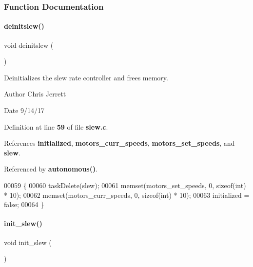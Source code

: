 \subsubsection{Function Documentation}
\mbox{\label{a00143_a981c9990a969d2587e66e550737f7cd9}} 
\paragraph{deinitslew()}
{\footnotesize\ttfamily void deinitslew (\begin{DoxyParamCaption}{ }\end{DoxyParamCaption})}



Deinitializes the slew rate controller and frees memory. 

\begin{DoxyAuthor}{Author}
Chris Jerrett 
\end{DoxyAuthor}
\begin{DoxyDate}{Date}
9/14/17 
\end{DoxyDate}


Definition at line \textbf{ 59} of file \textbf{ slew.\+c}.



References \textbf{ initialized}, \textbf{ motors\+\_\+curr\+\_\+speeds}, \textbf{ motors\+\_\+set\+\_\+speeds}, and \textbf{ slew}.



Referenced by \textbf{ autonomous()}.


\begin{DoxyCode}
00059                   \{
00060   taskDelete(slew);
00061   memset(motors_set_speeds, 0, \textcolor{keyword}{sizeof}(\textcolor{keywordtype}{int}) * 10);
00062   memset(motors_curr_speeds, 0, \textcolor{keyword}{sizeof}(\textcolor{keywordtype}{int}) * 10);
00063   initialized = \textcolor{keyword}{false};
00064 \}
\end{DoxyCode}
\mbox{\label{a00143_a321758941d88b75783955c819bb75005}} 
\paragraph{init\+\_\+slew()}
{\footnotesize\ttfamily void init\+\_\+slew (\begin{DoxyParamCaption}{ }\end{DoxyParamCaption})}



